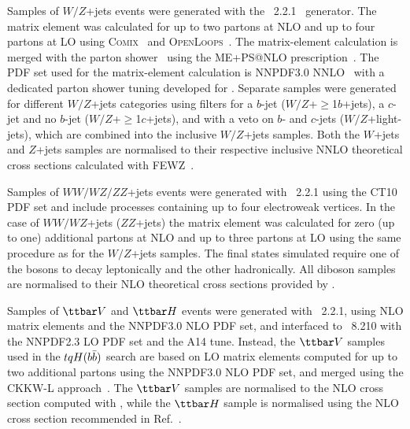 Samples of $W/Z$+jets events were generated with the {\sherpa}~2.2.1~\cite{Gleisberg:2008ta} generator. 
The matrix element was calculated for up to two partons at NLO and up to four partons at LO using 
\textsc{Comix}~\cite{Gleisberg:2008fv} and \textsc{OpenLoops}~\cite{Cascioli:2011va}. The matrix-element calculation 
is merged with the {\sherpa} parton shower~\cite{Schumann:2007mg} using the ME+PS@NLO prescription~\cite{Hoeche:2012yf}. 
The PDF set used for the matrix-element calculation is NNPDF3.0 NNLO~\cite{Ball:2014uwa} with a dedicated parton shower tuning developed for {\sherpa}. 
Separate samples were generated for different $W/Z$+jets categories using filters for a $b$-jet 
($W/Z$+$\geq$1$b$+jets), a $c$-jet and no $b$-jet ($W/Z$+$\geq$1$c$+jets), and with a veto on $b$- and $c$-jets 
($W/Z$+light-jets), which are combined into the inclusive $W/Z$+jets samples.
Both the $W$+jets and $Z$+jets samples are normalised to their respective inclusive NNLO theoretical 
cross sections calculated with \textsc{FEWZ}~\cite{Anastasiou:2003ds}.

Samples of $WW/WZ/ZZ$+jets events were generated with {\sherpa}~2.2.1 using the CT10 PDF set
and include processes containing up to four electroweak vertices. 
In the case of $WW/WZ$+jets ($ZZ$+jets) the matrix element was calculated for zero (up to one) additional partons 
at NLO and up to three partons at LO using the same procedure as for the $W/Z$+jets samples. 
The final states simulated require one of the bosons to decay leptonically and the other hadronically.
All diboson samples are normalised to their NLO theoretical cross sections provided by {\sherpa}. 

Samples of $\ttbar V$ and $\ttbar H$ events were generated with {\amcatnlo}~2.2.1, using NLO matrix elements and the NNPDF3.0 NLO PDF set,
and interfaced to {\pythia}~8.210 with the NNPDF2.3 LO PDF set and the A14 tune. 
Instead, the $\ttbar V$ samples used in the $tqH(b\bar{b})$ search are based on LO matrix elements computed for up to two additional partons 
using the NNPDF3.0 NLO PDF set, and merged using the CKKW-L approach~\cite{Lonnblad:2001iq}.
The $\ttbar V$ samples are normalised to the NLO cross section computed with {\amcatnlo}, while the $\ttbar H$ sample is normalised using 
the NLO cross section recommended in Ref.~\cite{deFlorian:2016spz}.

